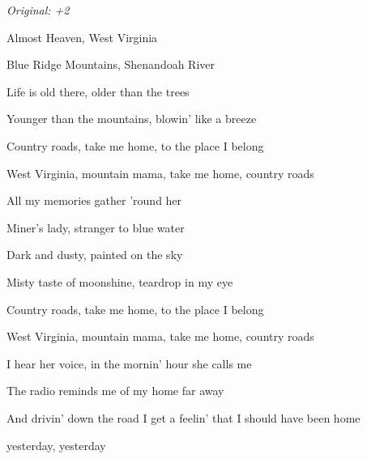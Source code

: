\begin{song}


\begin{strumbox}
\textit{Original: +2}
\end{strumbox}

\begin{hchordbox}
\end{hchordbox}

\bigskip

 Almost Heaven,  West Virginia \par
{} Blue Ridge Mountains, Shenandoah River \par
{} Life is old there, older than the trees \par
{}Younger than the mountains, blowin' like a breeze \par

\bigskip

Country roads, take me home, to the place I belong \par
West Virginia, mountain mama, take me home, country roads \par

\bigskip

 All my memories  gather 'round her \par
{} Miner's lady, stranger to blue water \par
{} Dark and dusty, painted on the sky \par
{}Misty taste of moonshine, teardrop in my eye \par

\bigskip

Country roads, take me home, to the place I belong \par
West Virginia, mountain mama, take me home, country roads \par

\bigskip

 I hear her voice, in the mornin' hour she calls me \par
The radio reminds me of my home far away \par
And drivin' down the road I get a feelin' that I should have been home \par
{}yesterday, yesterday \par


\end{song}
